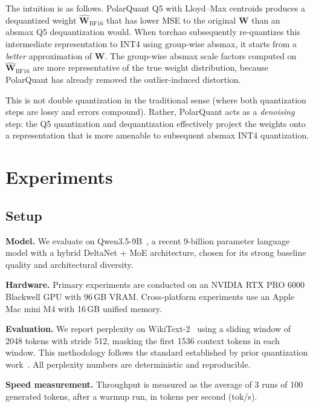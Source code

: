 \documentclass[10pt,twocolumn]{article}
\newcommand{\bW}{\mathbf{W}}
\begin{document}
The intuition is as follows. PolarQuant Q5 with Lloyd--Max centroids produces a dequantized weight $\hat{\bW}_{\text{BF16}}$ that has lower MSE to the original $\bW$ than an absmax Q5 dequantization would. When torchao subsequently re-quantizes this intermediate representation to INT4 using group-wise absmax, it starts from a \emph{better} approximation of $\bW$. The group-wise absmax scale factors computed on $\hat{\bW}_{\text{BF16}}$ are more representative of the true weight distribution, because PolarQuant has already removed the outlier-induced distortion.

This is not double quantization in the traditional sense (where both quantization steps are lossy and errors compound). Rather, PolarQuant acts as a \emph{denoising} step: the Q5 quantization and dequantization effectively project the weights onto a representation that is more amenable to subsequent absmax INT4 quantization.

\section{Experiments}
\label{sec:experiments}

\subsection{Setup}
\label{sec:setup}

\textbf{Model.} We evaluate on Qwen3.5-9B~\cite{qwen2025qwen3}, a recent 9-billion parameter language model with a hybrid DeltaNet + MoE architecture, chosen for its strong baseline quality and architectural diversity.

\textbf{Hardware.} Primary experiments are conducted on an NVIDIA RTX PRO 6000 Blackwell GPU with 96\,GB VRAM. Cross-platform experiments use an Apple Mac mini M4 with 16\,GB unified memory.

\textbf{Evaluation.} We report perplexity on WikiText-2~\cite{merity2016wikitext} using a sliding window of 2048 tokens with stride 512, masking the first 1536 context tokens in each window. This methodology follows the standard established by prior quantization work~\cite{frantar2023gptq, lin2024awq}. All perplexity numbers are deterministic and reproducible.

\textbf{Speed measurement.} Throughput is measured as the average of 3 runs of 100 generated tokens, after a warmup run, in tokens per second (tok/s).
\end{document}
